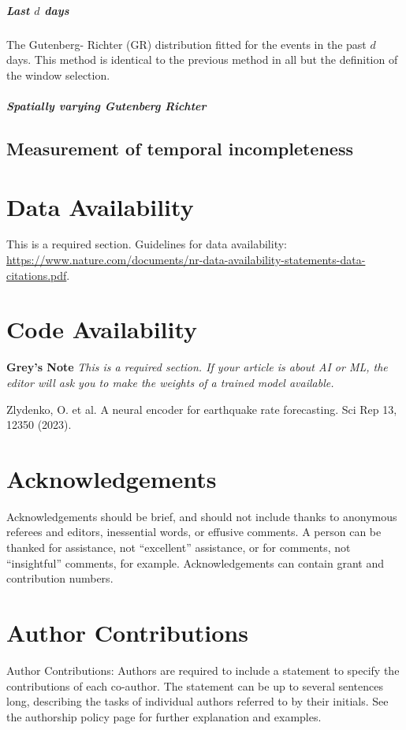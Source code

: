 \documentclass[pdflatex]{sn-jnl}
\begin{document}
\subparagraph{Last $d$ days} The Gutenberg- Richter (GR) distribution fitted for the events in the past $d$ days. This method is identical to the previous method in all but the definition of the window selection.


\subparagraph{Spatially varying Gutenberg Richter}
\subsection{Measurement of temporal incompleteness}




\section*{Data Availability}
This is a required section. Guidelines for data availability: \url{https://www.nature.com/documents/nr-data-availability-statements-data-citations.pdf}.

\section*{Code Availability}
\textbf{Grey's Note} \textit{This is a required section. If your article is about AI or ML, the editor will ask you to make the weights of a trained model available.}


\newpage
\renewcommand\refname{Methods References}
\begin{thebibliography}{10}
Zlydenko, O. et al. A neural encoder for earthquake rate forecasting. Sci Rep 13, 12350 (2023).
\end{thebibliography}


\newpage
\section*{Acknowledgements}
Acknowledgements should be brief, and should not include thanks to anonymous referees and editors, inessential words, or effusive comments. A person can be thanked for assistance, not “excellent” assistance, or for comments, not “insightful” comments, for example. Acknowledgements can contain grant and contribution numbers.

\section*{Author Contributions}
Author Contributions: Authors are required to include a statement to specify the contributions of each co-author. The statement can be up to several sentences long, describing the tasks of individual authors referred to by their initials. See the authorship policy page for further explanation and examples.
\end{document}
